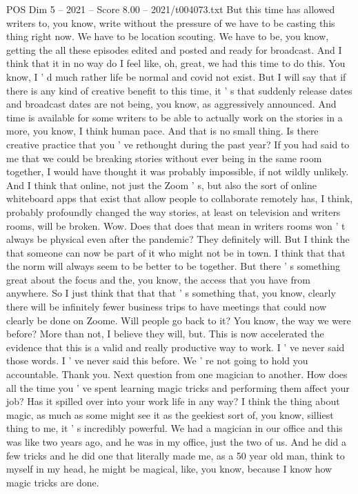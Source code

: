 \begin{textsample}{POS Dim 5 – 2021 – Score 8.00 – 2021/t004073.txt}
But this time has allowed writers to, you know, write without the pressure of we have to be casting this thing right now.
We have to be location scouting.
We have to be, you know, getting the all these episodes edited and posted and ready for broadcast.
And I think that it in no way do I feel like, oh, great, we had this time to do this.
You know, I ' d much rather life be normal and covid not exist.
But I will say that if there is any kind of creative benefit to this time, it ' s that suddenly release dates and broadcast dates are not being, you know, as aggressively announced.
And time is available for some writers to be able to actually work on the stories in a more, you know, I think human pace.
And that is no small thing.
Is there creative practice that you ' ve rethought during the past year?
If you had said to me that we could be breaking stories without ever being in the same room together, I would have thought it was probably impossible, if not wildly unlikely.
And I think that online, not just the Zoom ' s, but also the sort of online whiteboard apps that exist that allow people to collaborate remotely has, I think, probably profoundly changed the way stories, at least on television and writers rooms, will be broken.
Wow.
Does that does that mean in writers rooms won ' t always be physical even after the pandemic?
They definitely will.
But I think the that someone can now be part of it who might not be in town.
I think that that the norm will always seem to be better to be together.
But there ' s something great about the focus and the, you know, the access that you have from anywhere.
So I just think that that that ' s something that, you know, clearly there will be infinitely fewer business trips to have meetings that could now clearly be done on Zoome.
Will people go back to it?
You know, the way we were before?
More than not, I believe they will, but.
This is now accelerated the evidence that this is a valid and really productive way to work.
I ' ve never said those words.
I ' ve never said this before.
We ' re not going to hold you accountable.
Thank you.
Next question from one magician to another.
How does all the time you ' ve spent learning magic tricks and performing them affect your job?
Has it spilled over into your work life in any way?
I think the thing about magic, as much as some might see it as the geekiest sort of, you know, silliest thing to me, it ' s incredibly powerful.
We had a magician in our office and this was like two years ago, and he was in my office, just the two of us.
And he did a few tricks and he did one that literally made me, as a 50 year old man, think to myself in my head, he might be magical, like, you know, because I know how magic tricks are done.

\end{textsample}
